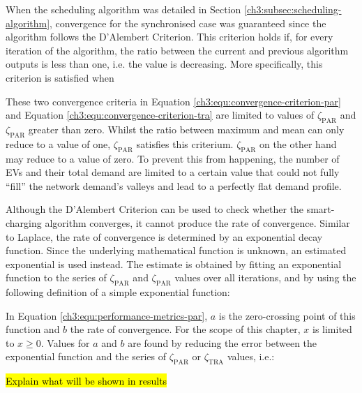 When the scheduling algorithm was detailed in Section \ref{ch3:subsec:scheduling-algorithm}, convergence for the synchronised case was guaranteed since the algorithm follows the D'Alembert Criterion.
This criterion holds if, for every iteration of the algorithm, the ratio between the current and previous algorithm outputs is less than one, i.e. the value is decreasing.
More specifically, this criterion is satisfied when



These two convergence criteria in Equation \ref{ch3:equ:convergence-criterion-par} and Equation \ref{ch3:equ:convergence-criterion-tra} are limited to values of $\zeta_\text{PAR}$ and $\zeta_\text{PAR}$ greater than zero.
Whilst the ratio between maximum and mean can only reduce to a value of one, $\zeta_\text{PAR}$ satisfies this criterium.
$\zeta_\text{PAR}$ on the other hand may reduce to a value of zero.
To prevent this from happening, the number of EVs and their total demand are limited to a certain value that could not fully ``fill'' the network demand's valleys and lead to a perfectly flat demand profile.

Although the D'Alembert Criterion can be used to check whether the smart-charging algorithm converges, it cannot produce the rate of convergence.
Similar to Laplace, the rate of convergence is determined by an exponential decay function.
Since the underlying mathematical function is unknown, an estimated exponential is used instead.
The estimate is obtained by fitting an exponential function to the series of $\zeta_\text{PAR}$ and $\zeta_\text{PAR}$ values over all iterations, and by using the following definition of a simple exponential function:



In Equation \ref{ch3:equ:performance-metrics-par}, $a$ is the zero-crossing point of this function and $b$ the rate of convergence.
For the scope of this chapter, $x$ is limited to $x \geq 0$.
Values for $a$ and $b$ are found by reducing the error between the exponential function and the series of $\zeta_\text{PAR}$ or $\zeta_\text{TRA}$ values, i.e.:



\hl{Explain what will be shown in results}





